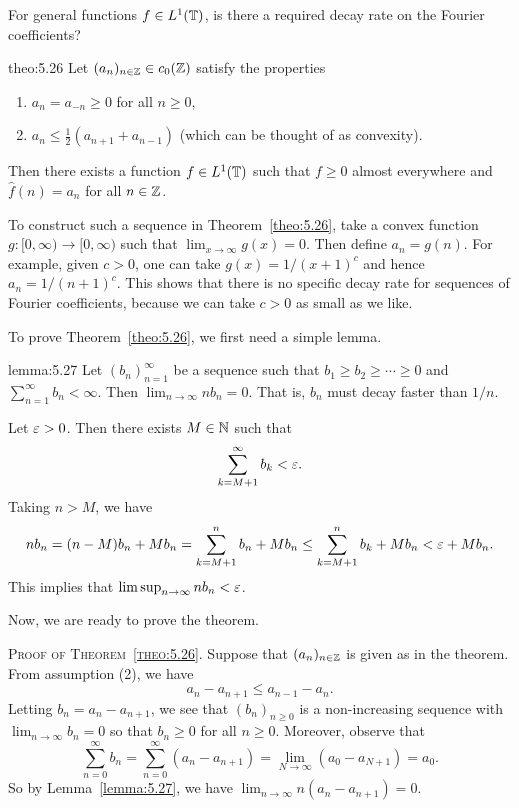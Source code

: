 For general functions $f \in L^1(\mathbb{T})$, is there a required decay rate on
the Fourier coefficients? 

\begin{theo}{theo:5.26}
    Let $(a_n)_{n\in\mathbb{Z}} \in c_0(\mathbb{Z})$ satisfy the properties 
    \begin{enumerate}[(1)]
        \item $a_n = a_{-n} \geq 0$ for all $n \geq 0$, 
        \item $a_n \leq \frac12(a_{n+1} + a_{n-1})$ (which can be thought of 
        as convexity).
    \end{enumerate}
    Then there exists a function $f \in L^1(\mathbb{T})$ such that $f \geq 0$ 
    almost everywhere and $\hat f(n) = a_n$ for all $n \in \mathbb{Z}$. 
\end{theo}

To construct such a sequence in Theorem~\ref{theo:5.26}, take a convex 
function $g : [0, \infty) \to [0, \infty)$ such that $\lim_{x\to\infty}
g(x) = 0$. Then define $a_n = g(n)$. For example, given $c > 0$, one can take 
$g(x) = 1/(x+1)^c$ and hence $a_n = 1/(n+1)^c$. This shows that there is 
no specific decay rate for sequences of Fourier coefficients, because 
we can take $c > 0$ as small as we like. 

To prove Theorem~\ref{theo:5.26}, we first need a simple lemma. 

\begin{lemma}{lemma:5.27}
    Let $(b_n)_{n=1}^\infty$ be a sequence such that $b_1 \geq b_2 \geq 
    \cdots \geq 0$ and $\sum_{n=1}^\infty b_n < \infty$. Then 
    $\lim_{n\to\infty} nb_n = 0$. That is, $b_n$ must decay faster than 
    $1/n$. 
\end{lemma}
\begin{pf}
    Let $\varepsilon > 0$. Then there exists $M \in \mathbb{N}$ such that 
    \[ \sum_{k=M+1}^\infty b_k < \varepsilon. \] 
    Taking $n > M$, we have 
    \[ nb_n = (n-M)b_n + Mb_n = \sum_{k=M+1}^n b_n + Mb_n 
    \leq \sum_{k=M+1}^n b_k + Mb_n < \varepsilon + Mb_n. \] 
    This implies that $\limsup_{n\to\infty} nb_n < \varepsilon$. 
\end{pf}

Now, we are ready to prove the theorem. 

\textsc{Proof of Theorem~\ref{theo:5.26}.} Suppose that $(a_n)_{n\in\mathbb{Z}}$ 
is given as in the theorem. From assumption (2), we have 
\[ a_n - a_{n+1} \leq a_{n-1} - a_n. \] 
Letting $b_n = a_n - a_{n+1}$, we see that $(b_n)_{n\geq0}$ is a 
non-increasing sequence with $\lim_{n\to\infty} b_n = 0$ so that 
$b_n \geq 0$ for all $n \geq 0$. Moreover, observe that 
\[ \sum_{n=0}^\infty b_n = \sum_{n=0}^\infty (a_n - a_{n+1}) 
= \lim_{N\to\infty} (a_0 - a_{N+1}) = a_0. \]  
So by Lemma~\ref{lemma:5.27}, we have $\lim_{n\to\infty} n(a_n - a_{n+1}) = 0$.

